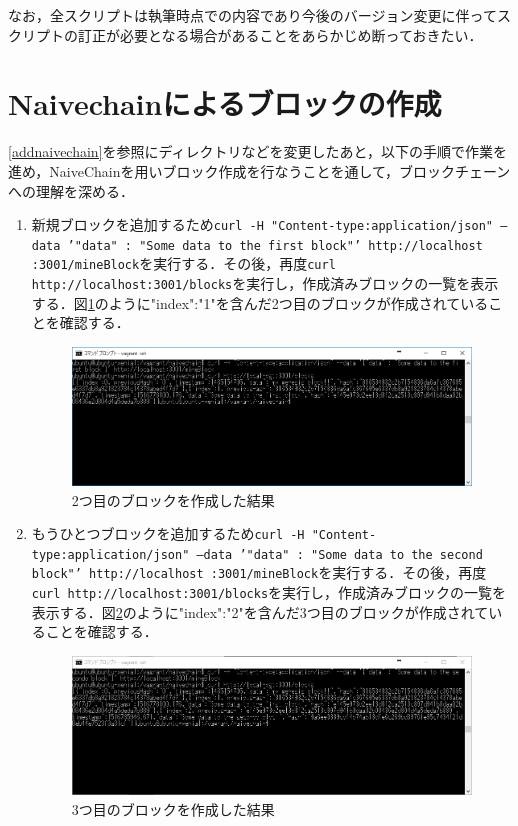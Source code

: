 なお，全スクリプトは執筆時点での内容であり今後のバージョン変更に伴ってスクリプトの訂正が必要となる場合があることをあらかじめ断っておきたい．

\newpage
\section{Naivechainによるブロックの作成}
\ref{addnaivechain}を参照にディレクトリなどを変更したあと，以下の手順で作業を進め，NaiveChainを用いブロック作成を行なうことを通して，ブロックチェーンへの理解を深める．
\begin{enumerate}
\item 新規ブロックを追加するため\texttt{curl -H "Content-type:application/json" 
--data '{"data" : "Some data to the first block"}' http://localhost
:3001/mineBlock}を実行する．その後，再度\texttt{curl http://localhost:3001/blocks}を実行し，作成済みブロックの一覧を表示する．図\ref{mineblocks}のように"index":"1"を含んだ2つ目のブロックが作成されていることを確認する．
\begin{figure}[htb]
\centering
\includegraphics[width=12cm]{images/3001mine.png}
\caption{2つ目のブロックを作成した結果}\label{mineblocks}
\end{figure}
\item もうひとつブロックを追加するため\texttt{curl -H "Content-type:application/json"
--data '{"data" : "Some data to the second block"}' http://localhost
:3001/mineBlock}を実行する．その後，再度\texttt{curl http://localhost:3001/blocks}を実行し，作成済みブロックの一覧を表示する．図\ref{mineblocks2}のように"index":"2"を含んだ3つ目のブロックが作成されていることを確認する．
\begin{figure}[htb]
\centering
\includegraphics[width=12cm]{images/3001mine2.png}
\caption{3つ目のブロックを作成した結果}\label{mineblocks2}
\end{figure}
\end{enumerate}

